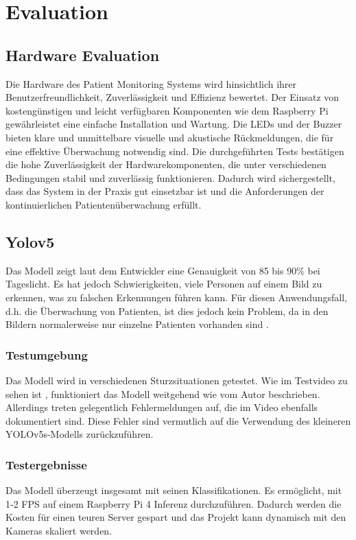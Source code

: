 \clearpage
\section{Evaluation}

\subsection{Hardware Evaluation}

Die Hardware des Patient Monitoring Systems wird hinsichtlich ihrer Benutzerfreundlichkeit, Zuverlässigkeit und Effizienz bewertet. Der Einsatz von kostengünstigen und leicht verfügbaren Komponenten wie dem Raspberry Pi gewährleistet eine einfache Installation und Wartung. Die LEDs und der Buzzer bieten klare und unmittelbare visuelle und akustische Rückmeldungen, die für eine effektive Überwachung notwendig sind. Die durchgeführten Tests bestätigen die hohe Zuverlässigkeit der Hardwarekomponenten, die unter verschiedenen Bedingungen stabil und zuverlässig funktionieren. Dadurch wird sichergestellt, dass das System in der Praxis gut einsetzbar ist und die Anforderungen der kontinuierlichen Patientenüberwachung erfüllt.

\subsection{Yolov5}
Das Modell zeigt laut dem Entwickler eine Genauigkeit von 85 bis 90\% bei Tageslicht. Es hat jedoch Schwierigkeiten, viele Personen auf einem Bild zu erkennen, was zu falschen Erkennungen führen kann. Für diesen Anwendungsfall, d.h. die Überwachung von Patienten, ist dies jedoch kein Problem, da in den Bildern normalerweise nur einzelne Patienten vorhanden sind \cite{kumar_uttej2001image-based-human-fall-detection_2024}. 

\subsubsection{Testumgebung}
Das Modell wird in verschiedenen Sturzsituationen getestet. Wie im Testvideo zu sehen ist \cite{yolovideo}, funktioniert das Modell weitgehend wie vom Autor beschrieben. Allerdings treten gelegentlich Fehlermeldungen auf, die im Video ebenfalls dokumentiert sind. Diese Fehler sind vermutlich auf die Verwendung des kleineren YOLOv5s-Modells zurückzuführen.

\subsubsection{Testergebnisse}
Das Modell überzeugt insgesamt mit seinen Klassifikationen. Es ermöglicht, mit 1-2 FPS auf einem Raspberry Pi 4 Inferenz durchzuführen. Dadurch werden die Kosten für einen teuren Server gespart und das Projekt kann dynamisch mit den Kameras skaliert werden.


